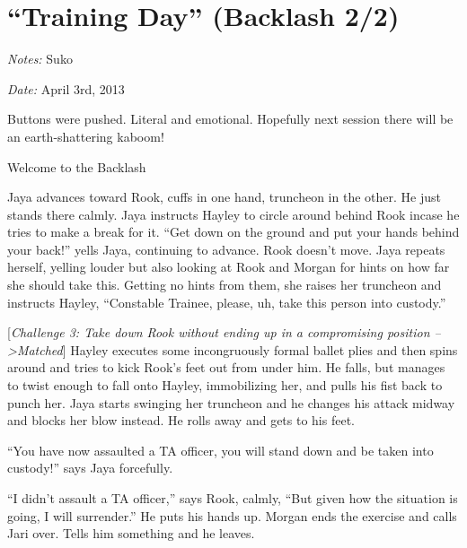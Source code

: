 \setcounter{chapter}{ 17 }
\chapter{\textbf{``Training Day'' (Backlash 2/2)} }






\textit{Notes:} Suko

\textit{Date:} April 3rd, 2013



Buttons were pushed.  Literal and emotional.  Hopefully next session there will be an earth-shattering kaboom!  



\noindent\hrulefill





 {\LARGE Welcome to the  }  {\LARGE Backlash } 



Jaya advances toward Rook, cuffs in one hand, truncheon in the other.  He just stands there calmly.  Jaya instructs Hayley to circle around behind Rook incase he tries to make a break for it.  ``Get down on the ground and put your hands behind your back!'' yells Jaya, continuing to advance.  Rook doesn't move.  Jaya repeats herself, yelling louder but also looking at Rook and Morgan for hints on how far she should take this.  Getting no hints from them, she raises her truncheon and instructs Hayley, ``Constable Trainee, please, uh, take this person into custody.''



{[}\textit{Challenge 3: Take down Rook without ending up in a compromising position --\textgreater  Matched}{]}  Hayley executes some incongruously formal ballet plies and then spins around and tries to kick Rook's feet out from under him.  He falls, but manages to twist enough to fall onto Hayley, immobilizing her, and pulls his fist back to punch her.  Jaya starts swinging her truncheon and he changes his attack midway and blocks her blow instead.  He rolls away and gets to his feet.



``You have now assaulted a TA officer, you will stand down and be taken into custody!'' says Jaya forcefully.



``I didn't assault a TA officer,'' says Rook, calmly, ``But given how the situation is going, I will surrender.''  He puts his hands up.  Morgan ends the exercise and calls Jari over.  Tells him something and he leaves.



